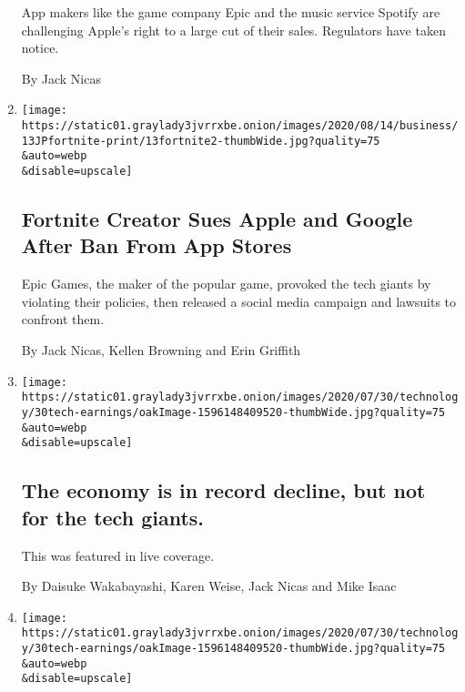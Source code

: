 \begin{enumerate}
  App makers like the game company Epic and the music service Spotify
  are challenging Apple's right to a large cut of their sales.
  Regulators have taken notice.

  By Jack Nicas
\item
  \href{/2020/08/13/technology/apple-fortnite-ban.html}{}

  \texttt{[image: https://static01.graylady3jvrrxbe.onion/images/2020/08/14/business/13JPfortnite-print/13fortnite2-thumbWide.jpg?quality=75\\\&auto=webp\\\&disable=upscale]}

  \hypertarget{fortnite-creator-sues-apple-and-google-after-ban-from-app-stores}{%
  \subsection{Fortnite Creator Sues Apple and Google After Ban From App
  Stores}\label{fortnite-creator-sues-apple-and-google-after-ban-from-app-stores}}

  Epic Games, the maker of the popular game, provoked the tech giants by
  violating their policies, then released a social media campaign and
  lawsuits to confront them.

  By Jack Nicas, Kellen Browning and Erin Griffith
\item
  \href{/live/2020/07/31/business/stock-market-today-coronavirus/the-economy-is-in-record-decline-but-not-for-the-tech-giants}{}

  \texttt{[image: https://static01.graylady3jvrrxbe.onion/images/2020/07/30/technology/30tech-earnings/oakImage-1596148409520-thumbWide.jpg?quality=75\\\&auto=webp\\\&disable=upscale]}

  \hypertarget{the-economy-is-in-record-decline-but-not-for-the-tech-giants}{%
  \subsection{The economy is in record decline, but not for the tech
  giants.}\label{the-economy-is-in-record-decline-but-not-for-the-tech-giants}}

  This was featured in live coverage.

  By Daisuke Wakabayashi, Karen Weise, Jack Nicas and Mike Isaac
\item
  \href{/2020/07/30/technology/tech-company-earnings-amazon-apple-facebook-google.html}{}

  \texttt{[image: https://static01.graylady3jvrrxbe.onion/images/2020/07/30/technology/30tech-earnings/oakImage-1596148409520-thumbWide.jpg?quality=75\\\&auto=webp\\\&disable=upscale]}


\end{enumerate}
